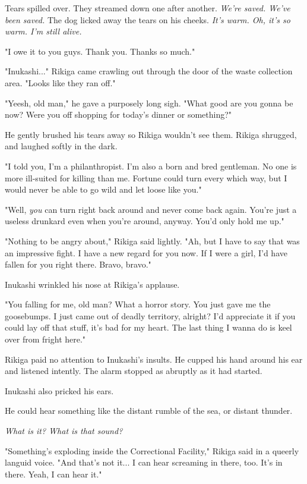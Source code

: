 Tears spilled over. They streamed down one after another. \emph{We're saved.
	We've been saved.} The dog licked away the tears on his cheeks. \emph{It's
	warm. Oh, it's so warm. I'm still alive.}

"I owe it to you guys. Thank you. Thanks so much."

"Inukashi..." Rikiga came crawling out through the door of the waste
collection area. "Looks like they ran off."

"Yeesh, old man," he gave a purposely long sigh. "What good are you
gonna be now? Were you off shopping for today's dinner or something?"

He gently brushed his tears away so Rikiga wouldn't see them. Rikiga
shrugged, and laughed softly in the dark.

"I told you, I'm a philanthropist. I'm also a born and bred gentleman.
No one is more ill-suited for killing than me. Fortune could turn every
which way, but I would never be able to go wild and let loose like you."

"Well, \emph{you} can turn right back around and never come back again. You're
just a useless drunkard even when you're around, anyway. You'd only hold
me up."

"Nothing to be angry about," Rikiga said lightly. "Ah, but I have to say
that was an impressive fight. I have a new regard for you now. If I were
a girl, I'd have fallen for you right there. Bravo, bravo."

Inukashi wrinkled his nose at Rikiga's applause.

"You falling for me, old man? What a horror story. You just gave me the
goosebumps. I just came out of deadly territory, alright? I'd appreciate
it if you could lay off that stuff, it's bad for my heart. The last
thing I wanna do is keel over from fright here."

Rikiga paid no attention to Inukashi's insults. He cupped his hand
around his ear and listened intently. The alarm stopped as abruptly as
it had started.

Inukashi also pricked his ears.

He could hear something like the distant rumble of the sea, or distant
thunder.

\emph{What is it? What is that sound?}

"Something's exploding inside the Correctional Facility," Rikiga said in
a queerly languid voice. "And that's not it... I can hear screaming in
there, too. It's in there. Yeah, I can hear it."

